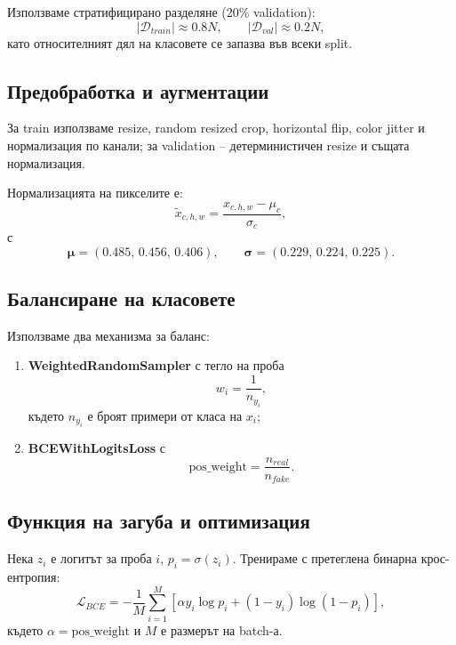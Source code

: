 \documentclass[12pt,a4paper]{article}
\begin{document}
Използваме стратифицирано разделяне (20\% validation):
\begin{equation}
|\mathcal{D}_{train}| \approx 0.8N, \qquad |\mathcal{D}_{val}| \approx 0.2N,
\end{equation}
като относителният дял на класовете се запазва във всеки split.

\subsection{Предобработка и аугментации}

За train използваме resize, random resized crop, horizontal flip,
color jitter и нормализация по канали; за validation -- детерминистичен
resize и същата нормализация.

Нормализацията на пикселите е:
\begin{equation}
\tilde{x}_{c,h,w} = \frac{x_{c,h,w} - \mu_c}{\sigma_c},
\end{equation}
с
\begin{equation}
\bm{\mu}=(0.485,\,0.456,\,0.406),
\qquad
\bm{\sigma}=(0.229,\,0.224,\,0.225).
\end{equation}

\subsection{Балансиране на класовете}

Използваме два механизма за баланс:
\begin{enumerate}
  \item \textbf{WeightedRandomSampler} с тегло на проба
  \begin{equation}
  w_i = \frac{1}{n_{y_i}},
  \end{equation}
  където $n_{y_i}$ е броят примери от класа на $x_i$;
  \item \textbf{BCEWithLogitsLoss} с
  \begin{equation}
  \text{pos\_weight} = \frac{n_{real}}{n_{fake}}.
  \end{equation}
\end{enumerate}

\subsection{Функция на загуба и оптимизация}

Нека $z_i$ е логитът за проба $i$, $p_i=\sigma(z_i)$.
Тренираме с претеглена бинарна крос-ентропия:
\begin{equation}
\mathcal{L}_{BCE} = -\frac{1}{M}\sum_{i=1}^{M}
\left[\alpha y_i \log p_i + (1-y_i)\log(1-p_i)\right],
\end{equation}
където $\alpha=\text{pos\_weight}$ и $M$ е размерът на batch-а.
\end{document}
